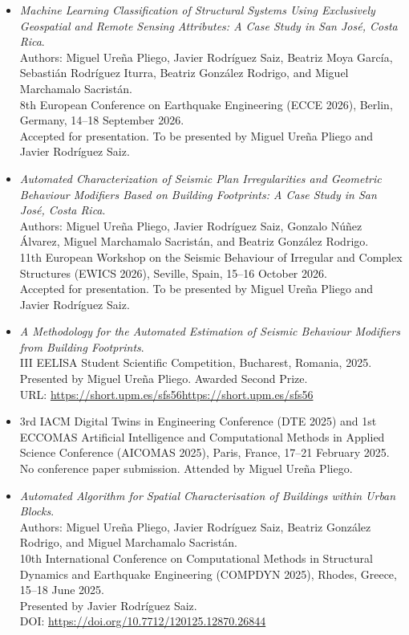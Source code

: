 \begin{itemize}
    \item \emph{Machine Learning Classification of Structural Systems Using Exclusively Geospatial and Remote Sensing Attributes: A Case Study in San José, Costa Rica}.\\
    Authors: Miguel Ureña Pliego, Javier Rodríguez Saiz, Beatriz Moya García, Sebastián Rodríguez Iturra, Beatriz González Rodrigo, and Miguel Marchamalo Sacristán.\\
    8th European Conference on Earthquake Engineering (ECCE 2026), Berlin, Germany, 14--18 September 2026.\\
    Accepted for presentation. To be presented by Miguel Ureña Pliego and Javier Rodríguez Saiz.
    
    \item \emph{Automated Characterization of Seismic Plan Irregularities and Geometric Behaviour Modifiers Based on Building Footprints: A Case Study in San José, Costa Rica}.\\
    Authors: Miguel Ureña Pliego, Javier Rodríguez Saiz, Gonzalo Núñez Álvarez, Miguel Marchamalo Sacristán, and Beatriz González Rodrigo.\\
    11th European Workshop on the Seismic Behaviour of Irregular and Complex Structures (EWICS 2026), Seville, Spain, 15--16 October 2026.\\
    Accepted for presentation. To be presented by Miguel Ureña Pliego and Javier Rodríguez Saiz.
    
    \item \emph{A Methodology for the Automated Estimation of Seismic Behaviour Modifiers from Building Footprints}.\\
    III EELISA Student Scientific Competition, Bucharest, Romania, 2025.\\
    Presented by Miguel Ureña Pliego. Awarded Second Prize.\\
    URL: \url{https://short.upm.es/sfs56https://short.upm.es/sfs56}
    
    \item 3rd IACM Digital Twins in Engineering Conference (DTE 2025) and 1st ECCOMAS Artificial Intelligence and Computational Methods in Applied Science Conference (AICOMAS 2025), Paris, France, 17--21 February 2025.\\
    No conference paper submission. Attended by Miguel Ureña Pliego.
    
    \item \emph{Automated Algorithm for Spatial Characterisation of Buildings within Urban Blocks}.\\
    Authors: Miguel Ureña Pliego, Javier Rodríguez Saiz, Beatriz González Rodrigo, and Miguel Marchamalo Sacristán.\\
    10th International Conference on Computational Methods in Structural Dynamics and Earthquake Engineering (COMPDYN 2025), Rhodes, Greece, 15--18 June 2025.\\
    Presented by Javier Rodríguez Saiz.\\
    DOI: \url{https://doi.org/10.7712/120125.12870.26844}
        

\end{itemize}
